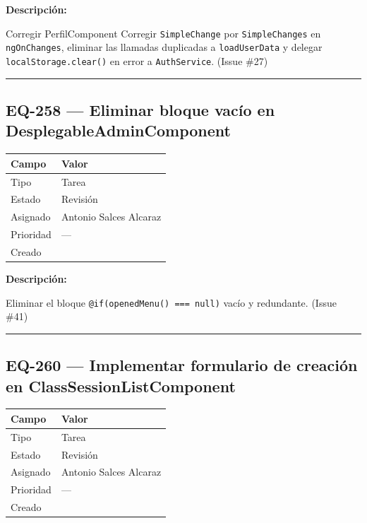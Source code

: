 \documentclass[
  spanish,
  11pt,
]{report}
\newcounter{none} %
\begin{document}
\textbf{Descripción:}

Corregir PerfilComponent Corregir \texttt{SimpleChange} por
\texttt{SimpleChanges} en \texttt{ngOnChanges}, eliminar las llamadas
duplicadas a \texttt{loadUserData} y delegar
\texttt{localStorage.clear()} en error a \texttt{AuthService}. (Issue
\#27)

\begin{center}\rule{0.5\linewidth}{0.5pt}\end{center}

\subsection{EQ-258 --- Eliminar bloque vacío en
DesplegableAdminComponent}\label{eq-258-eliminar-bloque-vacuxedo-en-desplegableadmincomponent}

{\def\LTcaptype{none} %
\begin{longtable}[]{@{}ll@{}}
\toprule\noalign{}
Campo & Valor \\
\midrule\noalign{}
\endhead
\bottomrule\noalign{}
\endlastfoot
Tipo & Tarea \\
Estado & Revisión \\
Asignado & Antonio Salces Alcaraz \\
Prioridad & --- \\
Creado & \\
\end{longtable}
}

\textbf{Descripción:}

Eliminar el bloque \texttt{@if(openedMenu()\ ===\ null)} vacío y
redundante. (Issue \#41)

\begin{center}\rule{0.5\linewidth}{0.5pt}\end{center}

\subsection{EQ-260 --- Implementar formulario de creación en
ClassSessionListComponent}\label{eq-260-implementar-formulario-de-creaciuxf3n-en-classsessionlistcomponent}

{\def\LTcaptype{none} %
\begin{longtable}[]{@{}ll@{}}
\toprule\noalign{}
Campo & Valor \\
\midrule\noalign{}
\endhead
\bottomrule\noalign{}
\endlastfoot
Tipo & Tarea \\
Estado & Revisión \\
Asignado & Antonio Salces Alcaraz \\
Prioridad & --- \\
Creado & \\
\end{longtable}
}
\end{document}
